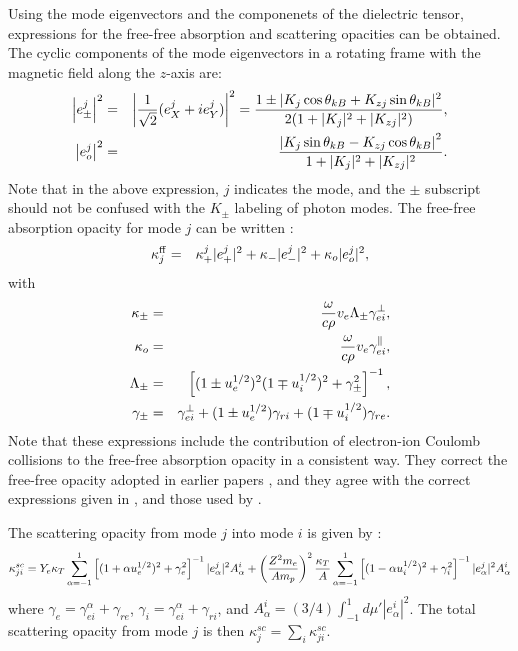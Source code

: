\documentclass[useAMS,onecolumn,usenatbib,usegraphicx]{mn2e}
\begin{document}
Using the mode eigenvectors and the componenets of the dielectric tensor, expressions for the free-free absorption and 
scattering opacities can be 
obtained.  The cyclic components of the mode eigenvectors in a rotating frame with the magnetic field along the 
$z$-axis are:
\begin{eqnarray}
\left |e_{\pm}^j\right |^2 & = & \left|{1\over\sqrt{2}}(e_X^j+i e_Y^j)\right|^2 = 
{1\pm|K_j\cos\theta_{kB}+K_{zj}\sin\theta_{kB}|^2\over 2(1+|K_j|^2+|K_{zj}|^2)},\\
\left|e_{o}^j\right|^2 & = & {\left|K_j\sin\theta_{kB}-K_{zj}\cos\theta_{kB}\right|^2\over 1+|K_j|^2+|K_{zj}|^2}.
\end{eqnarray}
Note that in the above expression, $j$ indicates the mode, and the $\pm$ subscript should not be confused with the $K_{\pm}$ 
labeling of photon modes.  The free-free absorption opacity for mode $j$ can be written \citep[][]{LaiHo03a}:
\begin{eqnarray}
\kappa^{\rm ff}_j & = & \kappa_+^j|e_+^j|^2+\kappa_-|e_-^j|^2+\kappa_o|e_o^j|^2,
\end{eqnarray}
with
\begin{eqnarray}
\kappa_{\pm} & = & {\omega\over c\rho}  v_e \Lambda_{\pm}\gamma_{ei}^{\perp},\\
\kappa_o & = & {\omega\over c\rho} v_e\gamma_{ei}^{\parallel},\\
\Lambda_{\pm} & = & \left[(1\pm u_e^{1/2})^2(1\mp u_i^{1/2})^2+\gamma_{\pm}^2\right]^{-1},\\
\gamma_{\pm} & = & \gamma_{ei}^{\perp} + (1\pm u_e^{1/2})\gamma_{ri} + (1\mp u_i^{1/2})\gamma_{re}.
\end{eqnarray}
Note that these expressions include the contribution of electron-ion Coulomb collisions to the free-free absorption 
opacity in a consistent way.  They correct the free-free opacity adopted in earlier papers 
\citep[e.g.][]{Pavlovetal95a,HoLai01a},
and they agree with the correct expressions given in \citet[][]{PotekhinChabrier03a}, and those used by 
\citet[][]{Hoetal03a,Hoetal04a}.

The scattering opacity from 
mode $j$ into mode $i$ is given by \citet[][]{Ventura79a} \citep[see][]{HoLai01a}:
\begin{eqnarray}
\kappa^{sc}_{ji}=Y_e\kappa_T\sum_{\alpha=-1}^1\left[(1+\alpha u_e^{1/2})^2+\gamma_e^2\right]^{-1}
|e_{\alpha}^j|^2 A_{\alpha}^i+\left({Z^2 m_e\over A m_p}\right)^2 {\kappa_T\over A}\sum_{\alpha=-1}^1
\left[(1-\alpha u_i^{1/2})^2+\gamma_i^2\right]^{-1}|e_{\alpha}^j|^2 A_{\alpha}^i
\end{eqnarray}
where $\gamma_e=\gamma_{ei}^{\alpha}+\gamma_{re}$, $\gamma_i=\gamma_{ei}^{\alpha}+\gamma_{ri}$, and 
$A_{\alpha}^i=(3/4)\int_{-1}^1 d\mu' |e_{\alpha}^i|^2$.  The total 
scattering opacity from mode $j$ is then $\kappa_j^{sc}=\sum_i\kappa^{sc}_{ji}$.
\end{document}

